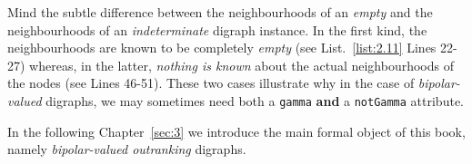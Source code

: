 Mind the subtle difference between the neighbourhoods of an \emph{empty} and the neighbourhoods of an \emph{indeterminate} digraph instance. In the first kind, the neighbourhoods are known to be completely \emph{empty}  (see List.~\vref{list:2.11} Lines 22-27) whereas, in the latter, \emph{nothing is known} about the actual neighbourhoods of the nodes  (see Lines 46-51). These two cases illustrate why in the case of \emph{bipolar-valued} digraphs, we may sometimes need both a \texttt{gamma} \textbf{and} a \texttt{notGamma} attribute.

\vspace{1cm}
In the following Chapter~\ref{sec:3}  we introduce the main formal object of this book, namely \emph{bipolar-valued outranking} digraphs.



%